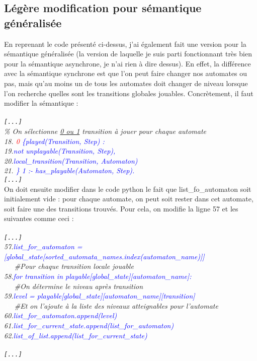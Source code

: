 \documentclass[12pt,a4paper]{article}
\begin{document}
\subsection{Légère modification pour sémantique généralisée}
En reprenant le code présenté ci-dessus, j'ai également fait une version pour la sémantique généralisée (la version de laquelle je suis parti fonctionnant très bien pour la sémantique asynchrone, je n'ai rien à dire 
dessus). En effet, la différence avec la sémantique synchrone est que l'on peut faire changer nos automates ou pas, mais qu'au moins un de tous les automates doit changer de niveau lorsque l'on recherche quelles sont les 
transitions globales jouables.
Concrètement, il faut modifier la sémantique :\\ \\
\emph{
	\verb![...]!\\
	\% On sélectionne \underline{0 ou 1} transition à jouer pour chaque automate\\
	18. \textcolor{blue}{\textcolor{red}{0} \{played(Transition, Step) :}\\
	19.\qquad\qquad\textcolor{blue}{not unplayable(Transition, Step),}\\
	20.\qquad\qquad\textcolor{blue}{local\_transition(Transition, Automaton)}\\
	21. \textcolor{blue}{\} 1 :- has\_playable(Automaton, Step).}\\
	\verb![...]!\\
}
On doit ensuite modifier dans le code python le fait que list\_fo\_automaton soit initialement vide : pour chaque automate, on peut soit rester dans cet automate, soit faire une des transitions trouvés. Pour cela, on modifie la 
ligne 57 et les suivantes comme ceci :\\ \\
\emph{
	\verb![...]!\\
		57.\qquad\qquad\textcolor{blue}{list\_for\_automaton = [global\_state[sorted\_automata\_names.index(automaton\_name)]]}\\
		\textcolor{white}{3ch}\qquad\qquad\#Pour chaque transition locale jouable\\
		58.\qquad\qquad\textcolor{blue}{for transition in playable[global\_state][automaton\_name]:}\\
			\textcolor{white}{3ch}\qquad\qquad\qquad\#On détermine le niveau après transition\\
			59.\qquad\qquad\qquad\textcolor{blue}{level = playable[global\_state][automaton\_name][transition]}\\
			\textcolor{white}{3ch}\qquad\qquad\qquad\#Et on l'ajoute à la liste des niveaux atteignables pour l'automate\\
			60.\qquad\qquad\qquad\textcolor{blue}{list\_for\_automaton.append(level)}\\
		61.\qquad\qquad\textcolor{blue}{list\_for\_current\_state.append(list\_for\_automaton)}\\
	62.\qquad\textcolor{blue}{list\_of\_list.append(list\_for\_current\_state)}\\ \\
	\verb![...]!\\
}
\end{document}

